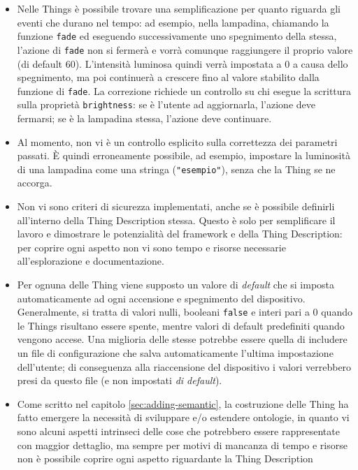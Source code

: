 \documentclass[12pt,a4paper,openright,oneside]{report}
\begin{document}
\begin{itemize}
	\item Nelle Things è possibile trovare una semplificazione per quanto riguarda gli eventi che durano nel tempo: ad esempio, nella lampadina, chiamando la funzione \texttt{fade} ed eseguendo successivamente uno spegnimento della stessa, l'azione di \texttt{fade} non si fermerà e vorrà comunque raggiungere il proprio valore (di default 60). L'intensità luminosa quindi verrà impostata a 0 a causa dello spegnimento, ma poi continuerà a crescere fino al valore stabilito dalla funzione di \texttt{fade}. La correzione richiede un controllo su chi esegue la scrittura sulla proprietà \texttt{brightness}: se è l'utente ad aggiornarla, l'azione deve fermarsi; se è la lampadina stessa, l'azione deve continuare.
	
	\item Al momento, non vi è un controllo esplicito sulla correttezza dei parametri passati. È quindi erroneamente possibile, ad esempio, impostare la luminosità di una lampadina come una stringa (\texttt{"esempio"}), senza che la Thing se ne accorga.
	
	\item Non vi sono criteri di sicurezza implementati, anche se è possibile definirli all'interno della Thing Description stessa. Questo è solo per semplificare il lavoro e dimostrare le potenzialità del framework e della Thing Description: per coprire ogni aspetto non vi sono tempo e risorse necessarie all'esplorazione e documentazione.
	
	\item Per ognuna delle Thing viene supposto un valore di \textit{default} che si imposta automaticamente ad ogni accensione e spegnimento del dispositivo. Generalmente, si tratta di valori nulli, booleani \texttt{false} e interi pari a 0 quando le Things risultano essere spente, mentre valori di default predefiniti quando vengono accese. Una miglioria delle stesse potrebbe essere quella di includere un file di configurazione che salva automaticamente l'ultima impostazione dell'utente; di conseguenza alla riaccensione del dispositivo i valori verrebbero presi da questo file (e non impostati \textit{di default}).
	
	\item Come scritto nel capitolo \ref{sec:adding-semantic}, la costruzione delle Thing ha fatto emergere la necessità di sviluppare e/o estendere ontologie, in quanto vi sono alcuni aspetti intrinseci delle cose che potrebbero essere rappresentate con maggior dettaglio, ma sempre per motivi di mancanza di tempo e risorse non è possibile coprire ogni aspetto riguardante la Thing Description
\end{itemize} 
\end{document}
